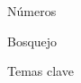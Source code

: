 \begin{section}{Números}
\begin{subsection}{Bosquejo}
\begin{subsubsection}{Temas clave}
		\end{subsubsection}
	\end{subsection}

\end{section}

%


